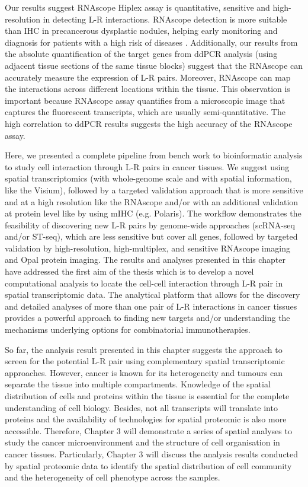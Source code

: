 Our results suggest RNAscope Hiplex assay is quantitative, sensitive and high-resolution in detecting L-R interactions. RNAscope detection is more suitable than IHC in precancerous dysplastic nodules, helping early monitoring and diagnosis for patients with a high risk of diseases \cite{bakheet2020improving}. Additionally, our results from the absolute quantification of the target genes from ddPCR analysis (using adjacent tissue sections of the same tissue blocks) suggest that the RNAscope can accurately measure the expression of L-R pairs. Moreover, RNAscope can map the interactions across different locations within the tissue. This observation is important because RNAscope assay quantifies from a microscopic image that captures the fluorescent transcripts, which are usually semi-quantitative. The high correlation to ddPCR results suggests the high accuracy of the RNAscope assay. 

Here, we presented a complete pipeline from bench work to bioinformatic analysis to study cell interaction through L-R pairs in cancer tissues. We suggest using spatial transcriptomics (with whole-genome scale and with spatial information, like the Visium), followed by a targeted validation approach that is more sensitive and at a high resolution like the RNAscope and/or with an additional validation at protein level like by using mIHC (e.g. Polaris). The workflow demonstrates the feasibility of discovering new L-R pairs by genome-wide approaches (scRNA-seq and/or ST-seq), which are less sensitive but cover all genes, followed by targeted validation by high-resolution, high-multiplex, and sensitive RNAscope imaging and Opal protein imaging. The results and analyses presented in this chapter have addressed the first aim of the thesis which is to develop a novel computational analysis to locate the cell-cell interaction through L-R pair in spatial transcriptomic data.  The analytical platform that allows for the discovery and detailed analyses of more than one pair of L-R interactions in cancer tissues provides a powerful approach to finding new targets and/or understanding the mechanisms underlying options for combinatorial immunotherapies. 

So far, the analysis result presented in this chapter suggests the approach to screen for the potential L-R pair using complementary spatial transcriptomic approaches.  However, cancer is known for its heterogeneity and tumours can separate the tissue into multiple compartments. Knowledge of the spatial distribution of cells and proteins within the tissue is essential for the complete understanding of cell biology. Besides, not all transcripts will translate into proteins and the availability of technologies for spatial proteomic is also more accessible. Therefore, Chapter 3 will demonstrate a series of spatial analyses to study the cancer microenvironment and the structure of cell organisation in cancer tissues.  Particularly, Chapter 3 will discuss the analysis results conducted by spatial proteomic data to identify the spatial distribution of cell community and the heterogeneity of cell phenotype across the samples. 


